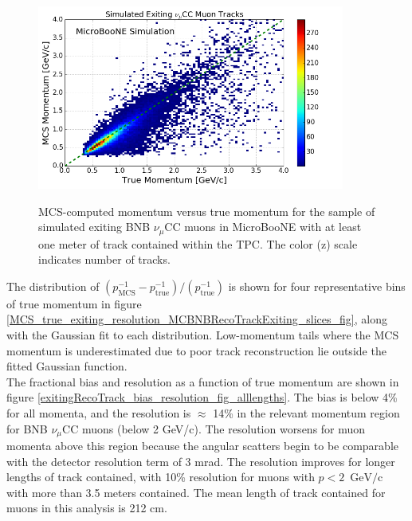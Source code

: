 \documentclass[a4paper,11pt]{article}
\begin{document}
\begin{figure}[ht!]
\centering
	\includegraphics[width=0.9\textwidth]{Figures/MCS_true_comparison_MCBNBRecoTrackExiting.png} \\
\caption{MCS-computed momentum versus true momentum for the sample of simulated exiting BNB $\nu_\mu$CC muons in MicroBooNE with at least one meter of track contained within the TPC. The color (z) scale indicates number of tracks.}\label{MCS_true_comparison_exiting_fig}
\end{figure}

The distribution of $(p_{\text{MCS}}^{-1} - p_{\text{true}}^{-1})/(p_{\text{true}}^{-1})$ is shown for four representative bins of true momentum in figure \ref{MCS_true_exiting_resolution_MCBNBRecoTrackExiting_slices_fig}, along with the Gaussian fit to each distribution. Low-momentum tails where the MCS momentum is underestimated due to poor track reconstruction lie outside the fitted Gaussian function.\\

The fractional bias and resolution as a function of true momentum are shown in figure \ref{exitingRecoTrack_bias_resolution_fig_alllengths}. The bias is below 4\% for all momenta, and the resolution is $\approx$ 14\% in the relevant momentum region for BNB $\nu_\mu$CC muons (below 2 GeV/c). The resolution worsens for muon momenta above this region because the angular scatters begin to be comparable with the detector resolution term of 3 mrad. The resolution improves for longer lengths of track contained, with 10\% resolution for muons with $p<2$~$\text{GeV/c}$ with more than 3.5 meters contained. The mean length of track contained for muons in this analysis is 212 cm.\\
\end{document}
